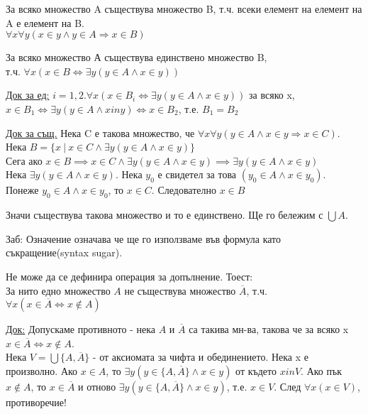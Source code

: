 \documentclass[fleqn, titlepage, 12pt]{report}
\begin{document}
 За всяко множество A съществува множество B,
т.ч. всеки елемент на елемент на A е елемент на B.\\
$ \forall{x} \forall{y} (x \in y \land y \in A \Rightarrow x \in B)$
\bigbreak

 За всяко множество А съществува единствено множество B,\\
т.ч. $ \forall{x} (x \in B \Leftrightarrow \exists{y} (y \in A \land x \in y))$
\bigbreak

\underline{Док за ед:}
$i = 1, 2. \forall{x} (x \in B_i \Leftrightarrow \exists{y} (y \in A \land x \in y))$ за всяко x,\\
$x \in B_1 \Leftrightarrow \exists{y} (y \in A \land x in y)\Leftrightarrow x \in B_2$, т.е. $B_1 = B_2$
\bigbreak

\underline{Док за същ.} Нека C е такова множество, че
$ \forall{x} \forall{y} (y \in A \land x \in y \Rightarrow x \in C)$.\\
Нека $B = \{x\ |\ x \in  C \land \exists{y} (y \in A \land x \in y)\}$\\
Сега ако $x \in B \implies x \in C \land \exists{y} (y \in A \land x \in y) \implies \exists{y} (y \in A \land x \in y)$\\
Нека $ \exists{y} (y \in A \land x \in y)$. Нека $y_0$ е свидетел за това $(y_0 \in A \land x \in y_0)$.\\
Понеже $y_0 \in A \land x \in y_0$, то $x \in C$. Следователно $x \in B$
\bigbreak

Значи съществува такова множество и то е единствено. Ще го бележим с $\bigcup A$.
\bigbreak

Заб: Означение означава че ще го използваме във формула като съкращение(syntax sugar).
\bigbreak

Не може да се дефинира операция за допълнение. Тоест:\\
 За нито едно множество $A$ не съществува множество
$\overline A$, т.ч. $ \forall{x} (x \in \overline{A} \Leftrightarrow x \notin A)$
\bigbreak

\underline{Док:} Допускаме противното - нека $A$ и $\overline{A}$ са такива мн-ва, такова че за всяко x
$x \in \overline{A} \Leftrightarrow x \notin A$.\\
Нека $V = \bigcup \{ A, \overline{A}\}$ - от аксиомата за чифта и обединението. Нека x е произволно. Ако $x \in A$, то
$ \exists{y} (y \in \{ A, \overline{A}\} \land  x \in y)$ от където $x in V$. Ако пък $x \notin A$, то $x \in \overline{A}$
и отново $ \exists{y} (y \in \{ A, \overline{A}\} \land x \in y)$, т.е.
$x \in V$. След $ \forall{x} (x \in V)$, противоречие!
\bigbreak
\end{document}
